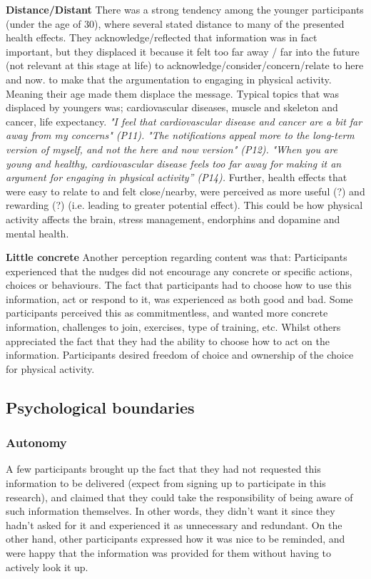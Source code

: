 \textbf{Distance/Distant}
There was a strong tendency among the younger participants (under the age of 30), where several stated distance to many of the presented health effects. They acknowledge/reflected that information was in fact important, but they displaced it because it felt too far away /  far into the future (not relevant at this stage at life) to acknowledge/consider/concern/relate to here and now. to make that the argumentation to engaging in physical activity. Meaning their age made them displace the message. Typical topics that was displaced by youngers was; cardiovascular diseases, muscle and skeleton and cancer, life expectancy. 
\textit{"I feel that cardiovascular disease and cancer are a bit far away from my concerns" (P11).}
\textit{"The notifications appeal more to the long-term version of myself, and not the here and now version" (P12).}
\textit{"When you are young and healthy, cardiovascular disease feels too far away for making it an argument for engaging in physical activity” (P14).} Further, health effects that were easy to relate to and felt close/nearby, were perceived as more useful (?) and rewarding (?) (i.e. leading to greater potential effect). This could be how physical activity affects the brain, stress management, endorphins and dopamine and mental health. 

\textbf{Little concrete}
Another perception regarding content was that: Participants experienced that the nudges did not encourage any concrete or specific actions, choices or behaviours. The fact that participants had to choose how to use this information, act or respond to it, was experienced as both good and bad. Some participants perceived this as commitmentless, and wanted more concrete information, challenges to join, exercises, type of training, etc. Whilst others appreciated the fact that they had the ability to choose how to act on the information. Participants desired freedom of choice and ownership of the choice for physical activity. 

\subsection{Psychological boundaries}
\subsubsection{Autonomy}
A few participants brought up the fact that they had not requested this information to be delivered (expect from signing up  to participate in this research), and claimed that they could take the responsibility of being aware of such information themselves. In other words, they didn't want it since they hadn't asked for it and experienced it as unnecessary and redundant. On the other hand, other participants expressed how it was nice to be reminded, and were happy that the information was provided for them without having to actively look it up. 


